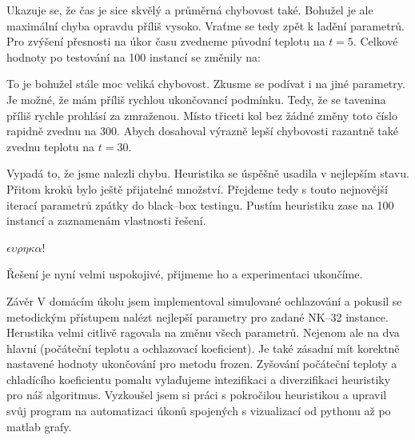 \bigskip
\centerline{}\bigskip


Ukazuje se, že čas je sice skvělý a průměrná chybovost také. Bohužel je ale maximální chyba opravdu příliš vysoko. Vraťme se tedy zpět k ladění parametrů. Pro zvýšení přesnosti na úkor času zvedneme původní teplotu na $t=5$. Celkové hodnoty po testování na 100 instancí se změnily na:

\bigskip
\centerline{}\bigskip

To je bohužel stále moc veliká chybovost. Zkusme se podívat i na jiné parametry. Je možné, že mám příliš rychlou ukončovancí podmínku. Tedy, že se tavenina příliš rychle prohlásí za zmraženou. Místo třiceti kol bez žádné změny toto číslo rapidně zvednu na 300. Abych dosahoval výrazně lepší chybovosti razantně také zvednu teplotu na $t=30$.


Vypadá to, že jsme nalezli chybu. Heuristika se úspěšně usadila v nejlepším stavu. Přitom kroků bylo ještě přijatelné množství. Přejdeme tedy s touto nejnovější iterací parametrů zpátky do black--box testingu. Pustím heuristiku zase na 100 instancí a zaznamenám vlastnosti řešení.

\bigskip
\centerline{}\bigskip

\hfill $\epsilon\upsilon\rho\eta\kappa\alpha$!

Řešení je nyní velmi uspokojivé, přijmeme ho a experimentaci ukončíme.









\sec Závěr
V domácím úkolu jsem implementoval simulované ochlazování a pokusil se metodickým přístupem nalézt nejlepší parametry pro zadané NK--32 instance. Herustika velmi citlivě ragovala na změnu všech parametrů. Nejenom ale na dva hlavní (počáteční teplotu a ochlazovací koeficient). Je také zásadní mít korektně nastavené hodnoty ukončování pro metodu frozen. Zyšování počáteční teploty a chladícího koeficientu pomalu vylaďujeme intezifikaci a diverzifikaci heuristiky pro náš algoritmus. Vyzkoušel jsem si práci s pokročilou heuristikou a upravil svůj program na automatizaci úkonů spojených s vizualizací od pythonu až po matlab grafy. 




\bye
